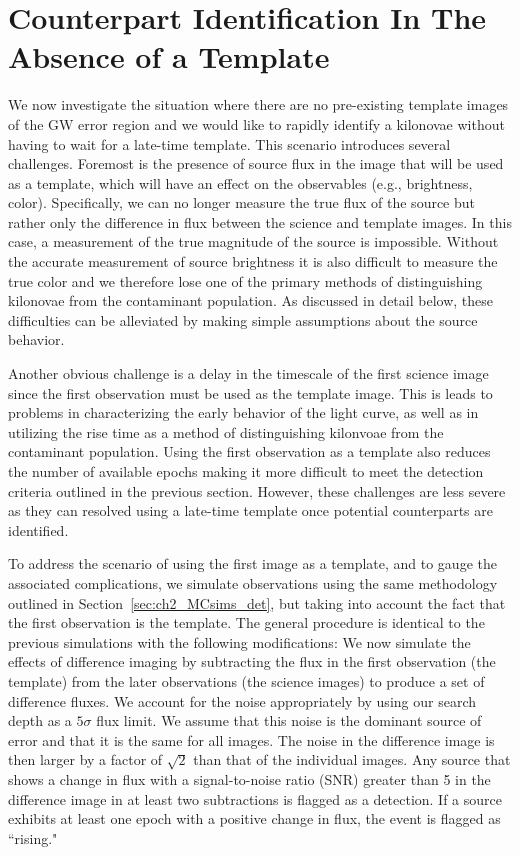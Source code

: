 \section{Counterpart Identification In The Absence of a Template}
\label{sec:ch2_diff}
We now investigate the situation where there are no pre-existing template images of the GW error region and we would like to rapidly identify a kilonovae without having to wait for a late-time template. This scenario introduces several challenges. Foremost is the presence of source flux in the image that will be used as a template, which will have an effect on the observables (e.g., brightness, color). Specifically, we can no longer measure the true flux of the source but rather only the difference in flux between the science and template images. In this case, a measurement of the true magnitude of the source is impossible. Without the accurate measurement of source brightness it is also difficult to measure the true color and we therefore lose one of the primary methods of distinguishing kilonovae from the contaminant population. As discussed in detail below, these difficulties can be alleviated by making simple assumptions about the source behavior.

Another obvious challenge is a delay in the timescale of the first science image since the first observation must be used as the template image. This is leads to problems in characterizing  the early behavior of the light curve, as well as in utilizing the rise time as a method of distinguishing kilonvoae from the contaminant population. Using the first observation as a template also reduces the number of available epochs making it more difficult to meet the detection criteria outlined in the previous section. However, these challenges are less severe as they can resolved using a late-time template once potential counterparts are identified.

To address the scenario of using the first image as a template, and to gauge the associated complications, we simulate observations using the same methodology outlined in Section~\ref{sec:ch2_MCsims_det}, but taking into account the fact that the first observation is the template. The general procedure is identical to the previous simulations with the following modifications: We now simulate the effects of difference imaging by subtracting the flux in the first observation (the template) from the later observations (the science images) to produce a set of difference fluxes. We account for the noise appropriately by using our search depth as a $5\sigma$ flux limit. We assume that this noise is the dominant source of error and that it is the same for all images. The noise in the difference image is then larger by a factor of $\sqrt{2}$ than that of the individual images. Any source that shows a change in flux with a signal-to-noise ratio (SNR) greater than 5 in the difference image in at least two subtractions is flagged as a detection. If a source exhibits at least one epoch with a positive change in flux, the event is flagged as ``rising."


